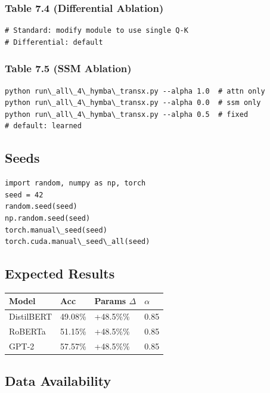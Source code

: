 \subsubsection{Table 7.4 (Differential Ablation)}
\begin{lstlisting}
# Standard: modify module to use single Q-K
# Differential: default
\end{lstlisting}

\subsubsection{Table 7.5 (SSM Ablation)}
\begin{lstlisting}
python run\_all\_4\_hymba\_transx.py --alpha 1.0  # attn only
python run\_all\_4\_hymba\_transx.py --alpha 0.0  # ssm only
python run\_all\_4\_hymba\_transx.py --alpha 0.5  # fixed
# default: learned
\end{lstlisting}

\subsection{Seeds}

\begin{lstlisting}
import random, numpy as np, torch
seed = 42
random.seed(seed)
np.random.seed(seed)
torch.manual\_seed(seed)
torch.cuda.manual\_seed\_all(seed)
\end{lstlisting}

\subsection{Expected Results}

\begin{table}[H]
\centering
\small
\begin{tabular}{llll}
\toprule
\textbf{Model} & \textbf{Acc} & \textbf{Params $\Delta$} & \textbf{$\alpha$} \\
\midrule
DistilBERT & 49.08\% & +48.5\%\% & 0.85 \\
RoBERTa & 51.15\% & +48.5\%\% & 0.85 \\
GPT-2 & 57.57\% & +48.5\%\% & 0.85 \\
\bottomrule
\end{tabular}
\end{table}

\subsection{Data Availability}

